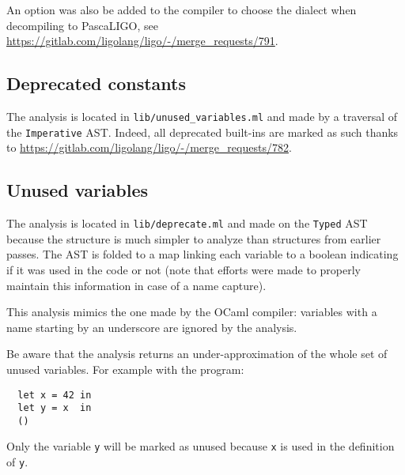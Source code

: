 \documentclass[10pt,a4paper]{article}
\begin{document}
An option was also be added to the compiler to choose the dialect when
decompiling to PascaLIGO, see
\url{https://gitlab.com/ligolang/ligo/-/merge_requests/791}.

\subsection{Deprecated constants}

The analysis is located in \verb|lib/unused_variables.ml| and made by
a traversal of the \verb|Imperative| AST. Indeed, all deprecated
built-ins are marked as such thanks to
\url{https://gitlab.com/ligolang/ligo/-/merge_requests/782}.


\subsection{Unused variables}

The analysis is located in \verb|lib/deprecate.ml| and made on the
\verb|Typed| AST because the structure is much simpler to analyze than
structures from earlier passes. The AST is folded to a map linking
each variable to a boolean indicating if it was used in the code or
not (note that efforts were made to properly maintain this information
in case of a name capture).

This analysis mimics the one made by the OCaml compiler: variables
with a name starting by an underscore are ignored by the analysis.

Be aware that the analysis returns an under-approximation of the whole
set of unused variables.  For example with the program:
\begin{verbatim}
  let x = 42 in
  let y = x  in
  ()
\end{verbatim}

Only the variable \verb|y| will be marked as unused because
\verb|x| is used in the definition of \verb|y|.


{}
\end{document}
